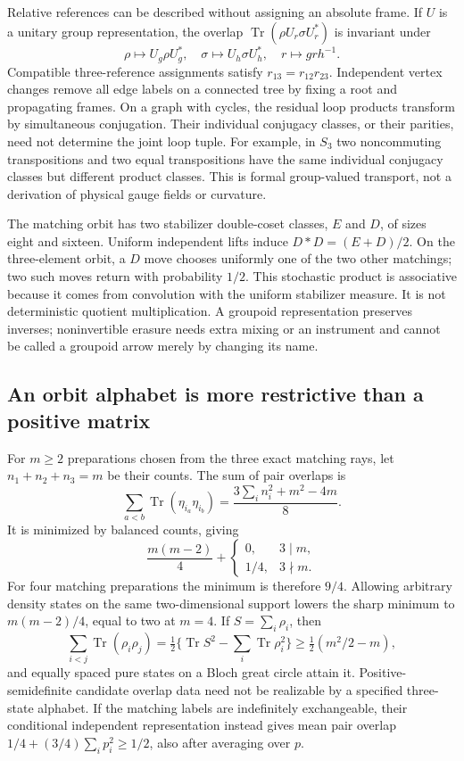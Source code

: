Relative references can be described without assigning an absolute frame. If $U$ is a unitary group representation, the overlap
$\operatorname{Tr}(\rho U_r\sigma U_r^*)$ is invariant under
\[
 \rho\mapsto U_g\rho U_g^*,\quad
 \sigma\mapsto U_h\sigma U_h^*,\quad r\mapsto grh^{-1}.
\]
Compatible three-reference assignments satisfy $r_{13}=r_{12}r_{23}$. Independent vertex changes remove all edge labels on a connected tree by fixing a root and propagating frames. On a graph with cycles, the residual loop products transform by simultaneous conjugation. Their individual conjugacy classes, or their parities, need not determine the joint loop tuple. For example, in $S_3$ two noncommuting transpositions and two equal transpositions have the same individual conjugacy classes but different product classes. This is formal group-valued transport, not a derivation of physical gauge fields or curvature.

The matching orbit has two stabilizer double-coset classes, $E$ and $D$, of sizes eight and sixteen. Uniform independent lifts induce
$D*D=(E+D)/2$.
On the three-element orbit, a $D$ move chooses uniformly one of the two other matchings; two such moves return with probability $1/2$. This stochastic product is associative because it comes from convolution with the uniform stabilizer measure. It is not deterministic quotient multiplication. A groupoid representation preserves inverses; noninvertible erasure needs extra mixing or an instrument and cannot be called a groupoid arrow merely by changing its name.

\subsection{An orbit alphabet is more restrictive than a positive matrix}
\label{qua:packing}
For $m\ge2$ preparations chosen from the three exact matching rays, let $n_1+n_2+n_3=m$ be their counts. The sum of pair overlaps is
\[
 \sum_{a<b}\operatorname{Tr}(\eta_{i_a}\eta_{i_b})
 =\frac{3\sum_i n_i^2+m^2-4m}{8}.
\]
It is minimized by balanced counts, giving
\[
 \frac{m(m-2)}4+\begin{cases}0,&3\mid m,\\1/4,&3\nmid m.\end{cases}
\]
For four matching preparations the minimum is therefore $9/4$. Allowing arbitrary density states on the same two-dimensional support lowers the sharp minimum to $m(m-2)/4$, equal to two at $m=4$. If $S=\sum_i\rho_i$, then
\[
 \sum_{i<j}\operatorname{Tr}(\rho_i\rho_j)
 =\tfrac12\{\operatorname{Tr}S^2-\sum_i\operatorname{Tr}\rho_i^2\}
 \ge\tfrac12(m^2/2-m),
\]
and equally spaced pure states on a Bloch great circle attain it. Positive-semidefinite candidate overlap data need not be realizable by a specified three-state alphabet. If the matching labels are indefinitely exchangeable, their conditional independent representation instead gives mean pair overlap
$1/4+(3/4)\sum_i p_i^2\ge1/2$, also after averaging over $p$.

